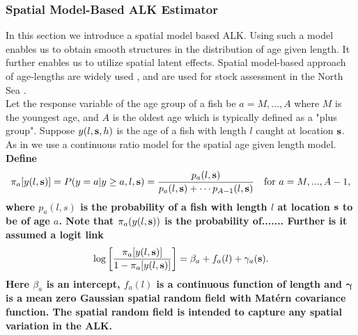 \documentclass[a4paper 12pt]{article}
\numberwithin{equation}{section}
\begin{document}
\subsubsection{Spatial Model-Based ALK Estimator}
\label{sec:spatialModelALK}
In this section we introduce a spatial model based ALK. Using such a model enables us to obtain smooth structures in the distribution of age given length. It further enables us to utilize spatial latent effects. Spatial model-based approach of age-lengths are widely used \citep{berg2012spatial, hirst2012bayesian, rindorf2001analyses}, and are used for stock assessment in the North Sea \citep{berg2014evaluation}. \\ %
\indent Let the response variable of the age group of a fish be $a = M,...,A$ where $M$ is the youngest age, and $A$ is the oldest age which is typically defined as a "plus group". Suppose $y(l,{\bf s},h)$ is the age  of a fish with length $l$ caught at location ${\bf s}$. As in \citet{berg2012spatial} we use a continuous ratio model for the spatial age given length model. {\bf Define
\begin{align}\label{eq:linearPred1}
\pi_a[y(l,{\bf s})] = P(y = a|y \geq a, l, {\bf s}) = \frac{p_a(l,{\bf s})}{p_a(l,{\bf s}) + \cdots p_{A-1}(l,{\bf s})} \vspace{ 4mm} \ \ \ \text{for } a =M,...,A-1 ,
\end{align}
where $p_a(l,s)$ is the probability of a fish with length $l$ at location ${\bf s}$ to be of age $a$. Note that $\pi_a(y(l,{\bf s}))$ is the probability of....... Further is it assumed a logit link
\begin{align}\label{eq:linearPred}
\log \left[ \frac{\pi_a[y(l,{\bf s})]}{1-\pi_a[y(l,{\bf s})]}\right] = \beta_a +  f_a(l) + \gamma_a({\bf s}).
\end{align}
Here $\beta_a$ is an intercept, $ f_a(l)$ is a continuous function of length and $\pmb{\gamma}$ is a mean zero Gaussian spatial random field with Mat\'{e}rn covariance function. The spatial random field is intended to capture any spatial variation in the ALK.} 
\end{document}
